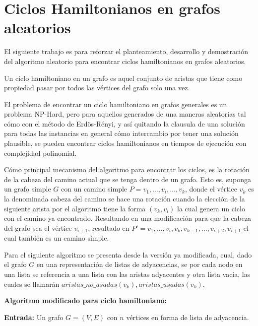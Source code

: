 \documentclass[12pt,letterpaper]{article}
\begin{document}
	\section*{Ciclos Hamiltonianos en grafos aleatorios}

	El siguiente trabajo es para reforzar el planteamiento, desarrollo y demostración del algoritmo aleatorio para encontrar ciclos hamiltonianos en grafos aleatorios.
    
    Un ciclo hamiltoniano en un grafo es aquel conjunto de aristas que tiene como propiedad pasar por todos las vértices del grafo solo una vez.
    
    El problema de encontrar un ciclo hamiltoniano en grafos generales es un problema NP-Hard, pero para aquellos generados de una maneras aleatorias tal cómo con el método de Erdös-Rényi, y así quitando la clausula de una solución para todas las instancias en general cómo intercambio por tener una solución plausible, se pueden encontrar ciclos hamiltonianos en tiempos de ejecución con complejidad polinomial.
    
   Cómo principal mecanismo del algoritmo para encontrar los ciclos, es la rotación de la cabeza del camino actual que se tenga dentro de un grafo. Esto es, suponga un grafo simple $G$  con un camino simple $P = v_1, \dots , v_i, \dots, v_k$, donde el vértice $v_k$ es la denominada cabeza del camino se hace una rotación cuando la elección de la siguiente arista por el algoritmo tiene la forma $(v_k, v_i)$ la cual genera un ciclo con el camino ya encontrado. Resultando en una modificación para que la cabeza del grafo sea el vértice $v_{i+1}$, resultado en $P'=v_1,\dots,v_i, v_k, v_{k-1},\dots, v_{i+2}, v_{i+1}$ el cual también es un camino simple.
   
   Para el siguiente algoritmo se presenta desde la versión ya modificada, cual, dado el grafo $G$ en una representación de listas de adyacencias, se por cada nodo en una lista se referencia a una lista con las aristas adyacentes y otra lista vacia, las cuales se llamarán $aristas\_no\_usadas(v_k), aristas\_usadas(v_k)$.
   
   \textbf{Algoritmo modificado para ciclo hamiltoniano:}
   
   \textbf{Entrada:} Un grafo $G = (V,E)$ con $n$ vértices en forma de lista de adyacencia. 
   
\end{document}
